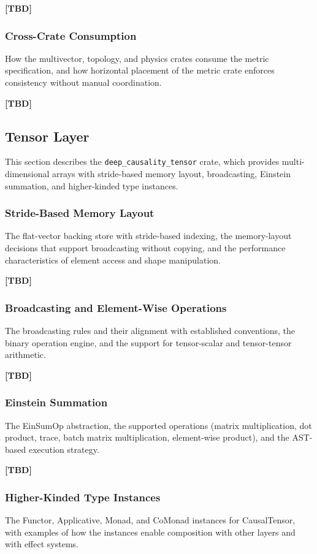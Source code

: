 \textbf{[TBD]}
 
\subsubsection{Cross-Crate Consumption}
How the multivector, topology, and physics crates consume the metric specification, and how horizontal placement of the metric crate enforces consistency without manual coordination.
 
\textbf{[TBD]}
 
 
\subsection{Tensor Layer}
\label{sec:implementation_tensor}
 
This section describes the \texttt{deep\_causality\_tensor} crate, which provides multi-dimensional arrays with stride-based memory layout, broadcasting, Einstein summation, and higher-kinded type instances.
 
\subsubsection{Stride-Based Memory Layout}
The flat-vector backing store with stride-based indexing, the memory-layout decisions that support broadcasting without copying, and the performance characteristics of element access and shape manipulation.
 
\textbf{[TBD]}
 
\subsubsection{Broadcasting and Element-Wise Operations}
The broadcasting rules and their alignment with established conventions, the binary operation engine, and the support for tensor-scalar and tensor-tensor arithmetic.
 
\textbf{[TBD]}
 
\subsubsection{Einstein Summation}
The EinSumOp abstraction, the supported operations (matrix multiplication, dot product, trace, batch matrix multiplication, element-wise product), and the AST-based execution strategy.
 
\textbf{[TBD]}
 
\subsubsection{Higher-Kinded Type Instances}
The Functor, Applicative, Monad, and CoMonad instances for CausalTensor, with examples of how the instances enable composition with other layers and with effect systems.
 
